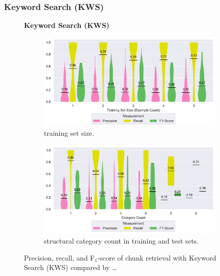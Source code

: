 \subsubsection{Keyword Search (KWS)}
\label{sec:r:kws}
\begin{figure}
\centering
    \textbf{Keyword Search (KWS)}\par\medskip
\begin{subfigure}[b]{\columnwidth}
		\centering
		\includegraphics[width=\columnwidth,
		clip]{img/big-study/recall-precision-examplecount-KWS.pdf}
		\caption{training set size.}
		\label{fig:recall-precision-examplecount-KWS}
\end{subfigure}\hspace{\fill}
\begin{subfigure}[b]{\columnwidth}
		\centering
		\includegraphics[width=\columnwidth,
		clip]{img/big-study/recall-precision-categorycount-KWS.pdf}
		\caption{structural category count
		in training and test sets.}
		\label{fig:recall-precision-categorycount-KWS}
\end{subfigure}
\caption{Precision, recall, and F$_{1}$-score of chunk retrieval with
Keyword Search (KWS) compared by \ldots}
\label{fig:results-KWS}
\end{figure}


